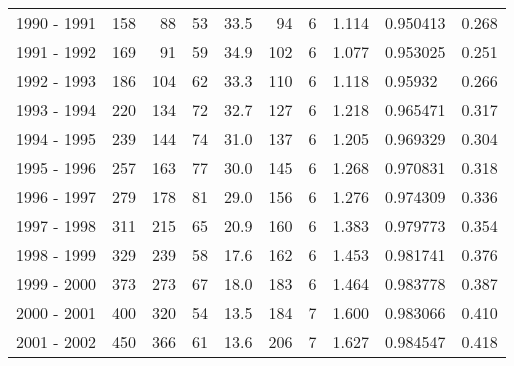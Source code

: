 \begin{tabular}{lrrrrrrrlr}
1990 - 1991 &      158 &       88 &                53 &              33.5 &                      94 &                          6 &       1.114 &   0.950413 &             0.268 \\
1991 - 1992 &      169 &       91 &                59 &              34.9 &                     102 &                          6 &       1.077 &   0.953025 &             0.251 \\
1992 - 1993 &      186 &      104 &                62 &              33.3 &                     110 &                          6 &       1.118 &    0.95932 &             0.266 \\
1993 - 1994 &      220 &      134 &                72 &              32.7 &                     127 &                          6 &       1.218 &   0.965471 &             0.317 \\
1994 - 1995 &      239 &      144 &                74 &              31.0 &                     137 &                          6 &       1.205 &   0.969329 &             0.304 \\
1995 - 1996 &      257 &      163 &                77 &              30.0 &                     145 &                          6 &       1.268 &   0.970831 &             0.318 \\
1996 - 1997 &      279 &      178 &                81 &              29.0 &                     156 &                          6 &       1.276 &   0.974309 &             0.336 \\
1997 - 1998 &      311 &      215 &                65 &              20.9 &                     160 &                          6 &       1.383 &   0.979773 &             0.354 \\
1998 - 1999 &      329 &      239 &                58 &              17.6 &                     162 &                          6 &       1.453 &   0.981741 &             0.376 \\
1999 - 2000 &      373 &      273 &                67 &              18.0 &                     183 &                          6 &       1.464 &   0.983778 &             0.387 \\
2000 - 2001 &      400 &      320 &                54 &              13.5 &                     184 &                          7 &       1.600 &   0.983066 &             0.410 \\
2001 - 2002 &      450 &      366 &                61 &              13.6 &                     206 &                          7 &       1.627 &   0.984547 &             0.418 \\

\end{tabular}
